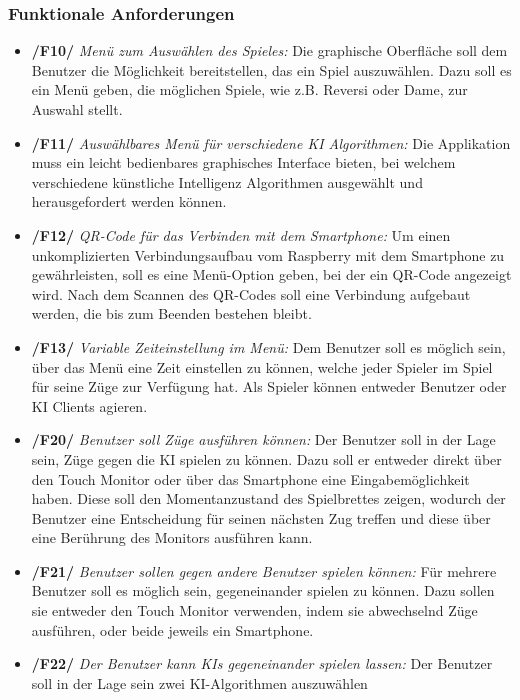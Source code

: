 \documentclass[12pt,a4paper,bibliography=totocnumbered,listof=totocnumbered]{article}
\begin{document}
\begin{appendix}
\subsubsection{Funktionale Anforderungen}
\begin{itemize}
    \item \textbf{/F10/} \textit{Menü zum Auswählen des Spieles:} Die graphische Oberfläche soll dem Benutzer die Möglichkeit bereitstellen, das ein Spiel auszuwählen.
        Dazu soll es ein Menü geben, die möglichen Spiele, wie z.B. Reversi oder Dame, zur Auswahl stellt.
    \item \textbf{/F11/} \textit{Auswählbares Menü für verschiedene \ac{KI} Algorithmen:} Die Applikation muss ein leicht bedienbares graphisches Interface bieten,
        bei welchem verschiedene künstliche Intelligenz Algorithmen ausgewählt und herausgefordert werden können.
    \item \textbf{/F12/} \textit{QR-Code für das Verbinden mit dem Smartphone:} Um einen unkomplizierten Verbindungsaufbau vom Raspberry mit dem Smartphone zu 
        gewährleisten, soll es eine Menü-Option geben, bei der ein QR-Code angezeigt wird. Nach dem Scannen des QR-Codes soll eine Verbindung
        aufgebaut werden, die bis zum Beenden bestehen bleibt.
    \item \textbf{/F13/} \textit{Variable Zeiteinstellung im Menü:} Dem Benutzer soll es möglich sein, über das Menü eine Zeit einstellen zu können, 
        welche jeder Spieler im Spiel für seine Züge zur Verfügung hat. Als Spieler können entweder Benutzer oder \ac{KI} Clients agieren.
    \item \textbf{/F20/} \textit{Benutzer soll Züge ausführen können:} Der Benutzer soll in der Lage sein, Züge gegen die \ac{KI} spielen zu können. Dazu soll er entweder
        direkt über den Touch Monitor oder über das Smartphone eine Eingabemöglichkeit haben. Diese soll den Momentanzustand des Spielbrettes zeigen,
        wodurch der Benutzer eine Entscheidung für seinen nächsten Zug treffen und diese über eine Berührung des Monitors ausführen kann.
    \item \textbf{/F21/} \textit{Benutzer sollen gegen andere Benutzer spielen können:} Für mehrere Benutzer soll es möglich sein, gegeneinander spielen zu können. Dazu sollen sie 
        entweder den Touch Monitor verwenden, indem sie abwechselnd Züge ausführen, oder beide jeweils ein Smartphone.
    \item \textbf{/F22/} \textit{Der Benutzer kann \ac{KI}s gegeneinander spielen lassen:} Der Benutzer soll in der Lage sein zwei \ac{KI}-Algorithmen auszuwählen

\end{itemize}
\end{appendix}
\end{document}
